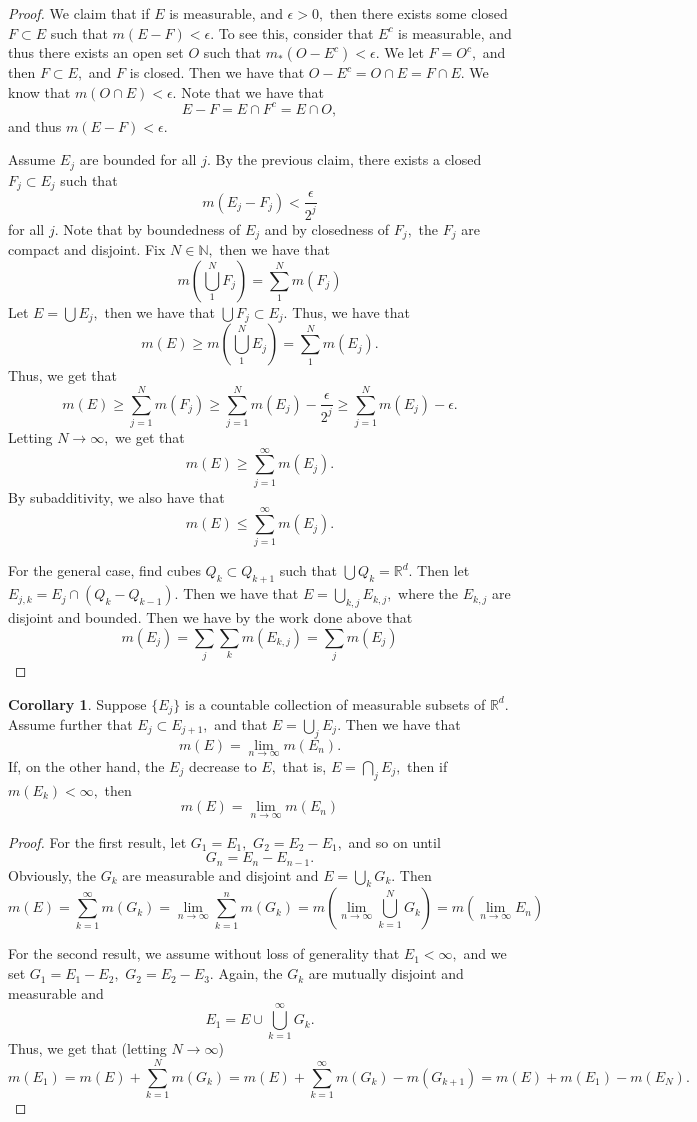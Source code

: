 \documentclass[10pt, oneside]{article}
\newcommand{\bbR}{\mathbb{R}}
\newcommand{\bbN}{\mathbb{N}}
\theoremstyle{definition}
\newtheorem{cor}{Corollary}
\begin{document}
\begin{proof}
    We claim that if $E$ is measurable, and $\epsilon>0,$ then there exists some closed $F \subset E$ such that $m(E - F) < \epsilon.$ To see this, consider that $E^c$ is measurable, and thus there exists an open set $O$ such that $m_\ast(O - E^c) < \epsilon.$ We let $F = O^c,$ and then $F \subset E,$ and $F$ is closed. Then we have that $O - E^c = O\cap E = F\cap E.$ We know that $m(O\cap E) < \epsilon.$ Note that we have that 
    \[E - F = E \cap F^c = E \cap O,\] and thus $m(E - F) < \epsilon.$

    Assume $E_j$ are bounded for all $j.$ By the previous claim, there exists a closed $F_j \subset E_j$ such that 
    \[m(E_j - F_j) < \frac{\epsilon}{2^j}\] for all $j.$ Note that by boundedness of $E_j$ and by closedness of $F_j,$ the $F_j$ are compact and disjoint. Fix $N\in \bbN,$ then we have that 
    \[m\left(\bigcup_1^N F_j\right) = \sum_1^Nm(F_j)\] Let $E = \bigcup E_j,$ then we have that $\bigcup F_j \subset E_j.$ Thus, we have that 
    \[m(E)\geq m(\bigcup_1^N E_j) = \sum_1^N m(E_j).\] Thus, we get that 
    \[m(E) \geq \sum_{j=1}^Nm(F_j) \geq \sum_{j=1}^N m(E_j) - \frac{\epsilon}{2^j}\geq \sum_{j=1}^N m(E_j) - \epsilon.\] Letting $N\to \infty,$ we get that 
    \[m(E)\geq \sum_{j=1}^\infty m(E_j).\] By subadditivity, we also have that 
    \[m(E)\leq \sum_{j=1}^\infty m(E_j).\]

    For the general case, find cubes $Q_k \subset Q_{k+1}$ such that $\bigcup Q_k = \bbR^d.$ Then let $E_{j,k} = E_j \cap (Q_k - Q_{k-1}).$ Then we have that $E = \bigcup_{k,j} E_{k,j},$ where the $E_{k,j}$ are disjoint and bounded. Then we have by the work done above that 
    \[m(E_j) = \sum_{j}\sum_k m(E_{k,j}) = \sum_j m(E_j)\]
\end{proof}
\begin{cor}
    Suppose $\{E_j\}$ is a countable collection of measurable subsets of $\bbR^d.$ Assume further that $E_j\subset E_{j+1},$ and that $E  = \bigcup_j E_j.$ Then we have that 
    \[m(E) = \lim_{n\to \infty} m(E_n).\] If, on the other hand, the $E_j$ decrease to $E,$ that is, $E = \bigcap_j E_j,$ then if $m(E_k)< \infty,$ then 
    \[m(E) = \lim_{n\to \infty} m(E_n)\]
\end{cor}
\begin{proof}
    For the first result, let $G_1 = E_1, $ $G_2 = E_2 - E_1,$ and so on until 
    \[G_n = E_n - E_{n-1}.\] Obviously, the $G_k$ are measurable and disjoint and $E = \bigcup_k G_k.$ Then 
    \[m(E) = \sum_{k=1}^\infty m(G_k) = \lim_{n\to \infty} \sum_{k=1}^n m(G_k) = m\left(\lim_{n\to \infty}\bigcup_{k=1}^N G_k\right) = m\left(\lim_{n\to \infty} E_n\right)\]

    For the second result, we assume without loss of generality that $E_1 <\infty,$ and we set $G_1 = E_1 - E_2,$ $G_2 = E_2 - E_3.$ Again, the $G_k$ are mutually disjoint and measurable and 
    \[E_1 = E \cup \bigcup_{k=1}^\infty G_k.\]
    Thus, we get that (letting $N\to \infty$)
    \[m(E_1) = m(E) + \sum_{k=1}^N m(G_k) = m(E) + \sum_{k=1}^\infty m(G_{k}) - m(G_{k+1}) = m(E) + m(E_1) - m(E_N).\]
\end{proof}
\end{document}
